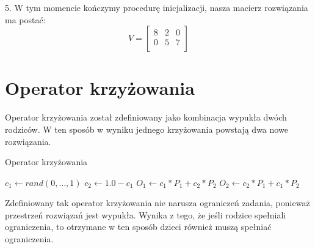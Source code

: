 \begin{example}
    5. W tym momencie kończymy procedurę inicjalizacji, nasza macierz rozwiązania ma postać:
    $$
    V
    =
    \begin{bmatrix}
        8 & 2 & 0 \\
        0 & 5 & 7 \\
    \end{bmatrix}
    $$
\end{example}


\section{Operator krzyżowania}
Operator krzyżowania został zdefiniowany jako kombinacja wypukła dwóch rodziców. W ten sposób w wyniku jednego krzyżowania powstają dwa nowe 
rozwiązania.

\begin{pseudokod}[H]
    \label{krzyżowanie}
    \caption{Operator krzyżowania}
    \BlankLine
    $c_1 \gets rand(0,\dots,1)$
    $c_2 \gets 1.0 - c_1$\;
    $O_1 \gets c_1 * P_1 + c_2 * P_2$\;
    $O_2 \gets c_2 * P_1 + c_1 * P_2$\;
    \;
\end{pseudokod}

Zdefiniowany tak operator krzyżowania nie narusza ograniczeń zadania, ponieważ przestrzeń rozwiązań jest wypukła. Wynika z tego, że jeśli 
rodzice spełniali ograniczenia, to otrzymane w ten sposób dzieci również muszą spełniać ograniczenia.


